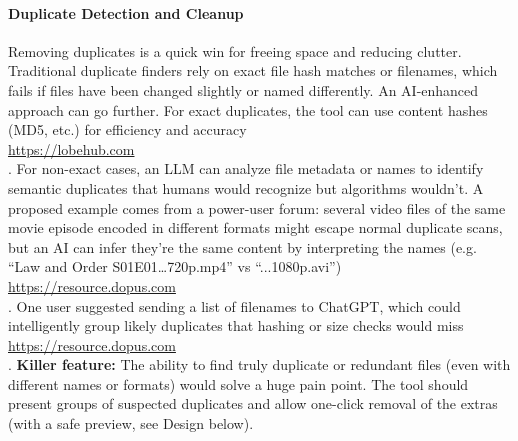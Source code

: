 \documentclass[11pt]{article}
\begin{document}
\paragraph{Duplicate Detection and Cleanup} Removing duplicates is a quick win for freeing space and reducing clutter. Traditional duplicate finders rely on exact file hash matches or filenames, which fails if files have been changed slightly or named differently. An AI-enhanced approach can go further. For exact duplicates, the tool can use content hashes (MD5, etc.) for efficiency and accuracy \\ \url{https://lobehub.com} \\ . For non-exact cases, an LLM can analyze file metadata or names to identify semantic duplicates that humans would recognize but algorithms wouldn’t. A proposed example comes from a power-user forum: several video files of the same movie episode encoded in different formats might escape normal duplicate scans, but an AI can infer they’re the same content by interpreting the names (e.g. “Law and Order S01E01…720p.mp4” vs “...1080p.avi”) \\ \url{https://resource.dopus.com} \\ . One user suggested sending a list of filenames to ChatGPT, which could intelligently group likely duplicates that hashing or size checks would miss \\ \url{https://resource.dopus.com} \\ . \textbf{Killer feature:} The ability to find truly duplicate or redundant files (even with different names or formats) would solve a huge pain point. The tool should present groups of suspected duplicates and allow one-click removal of the extras (with a safe preview, see Design below).
\end{document}
